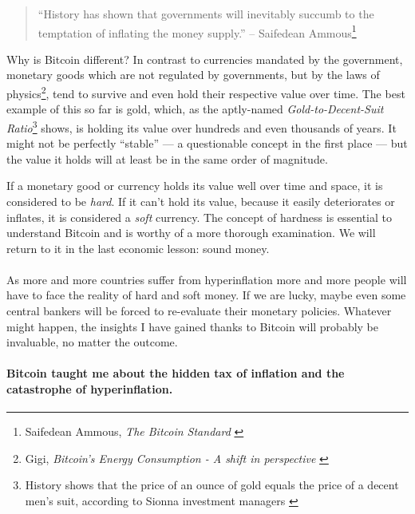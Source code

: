 \begin{quotation}\begin{samepage}
\enquote{History has shown that governments will inevitably succumb to the
temptation of inflating the money supply.}
\flushright -- Saifedean Ammous\footnote{Saifedean Ammous, \textit{The Bitcoin
Standard} \cite{bitcoin-standard}}
\end{samepage}\end{quotation}

\newpage

Why is Bitcoin different? In contrast to currencies mandated by the government,
monetary goods which are not regulated by governments, but by the laws of
physics\footnote{Gigi, \textit{Bitcoin's Energy Consumption - A shift in
perspective} \cite{gigi:energy}}, tend to survive and even hold their respective
value over time. The best example of this so far is gold, which, as the
aptly-named \textit{Gold-to-Decent-Suit Ratio}\footnote{History shows that the
price of an ounce of gold equals the price of a decent men's suit, according to Sionna
investment managers \cite{web:gold-to-decent-suite-ratio}} shows, is holding its
value over hundreds and even thousands of years. It might not be perfectly
\enquote{stable} --- a questionable concept in the first place --- but the value it
holds will at least be in the same order of magnitude.

If a monetary good or currency holds its value well over time and space,
it is considered to be \textit{hard}. If it can't hold its value, because it
easily deteriorates or inflates, it is considered a \textit{soft} currency. The
concept of hardness is essential to understand Bitcoin and is worthy of
a more thorough examination. We will return to it in the last economic
lesson: sound money.

\paragraph{}
As more and more countries suffer from
hyperinflation more and more people will have to face the reality
of hard and soft money. If we are lucky, maybe even some central bankers will be
forced to re-evaluate their monetary policies. Whatever might happen, the
insights I have gained thanks to Bitcoin will probably be invaluable, no matter
the outcome.

\paragraph{Bitcoin taught me about the hidden tax of inflation and the catastrophe
of hyperinflation.}

